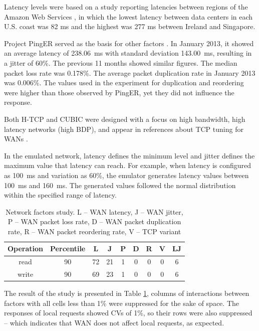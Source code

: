 \documentclass[man,floatsintext,12pt]{apa6}
\begin{document}
Latency levels were based on a study reporting latencies between regions of the
Amazon Web Services \parencite{Sovran2011}, in which the lowest latency between data
centers in each U.S. coast was 82 ms and the highest was 277 ms between Ireland
and Singapore.

Project PingER served as the basis for other factors \parencite{PingER2013}. In
January 2013, it showed an average latency of 238.06~ms with standard deviation
143.00~ms, resulting in a jitter of 60\%. The previous 11 months showed similar
figures. The median packet loss rate was 0.178\%. The average packet
duplication rate in January 2013 was 0.006\%. The values used in the experiment
for duplication and reordering were higher than those observed by PingER, yet
they did not influence the response.

Both H-TCP and CUBIC were designed with a focus on high bandwidth, high latency
networks (high BDP), and appear in references about TCP tuning for WANs
\parencite{ESnet2012}.

In the emulated network, latency defines the minimum level and jitter defines
the maximum value that latency can reach. For example, when latency is
configured as 100~ms and variation as 60\%, the emulator generates latency
values between 100~ms and 160~ms. The generated values followed the normal
distribution within the specified range of latency.

\begin{table}[h!]
\caption{Network factors study. L -- WAN latency, J -- WAN jitter, P -- WAN
packet loss rate, D -- WAN packet duplication rate, R -- WAN packet reordering
rate, V -- TCP variant}
\begin{tabular}{ccccccccc} \toprule

Operation & Percentile & L & J & P & D & R & V & LJ\\ \midrule

read & 90 & 72 & 21 & 1 & 0 & 0 & 0 & 6\\

write & 90 & 69 & 23 & 1 & 0 & 0 & 0 & 6\\ \bottomrule

\end{tabular}
\label{tab:estudo_para_fatores_de_rede}

\end{table}

The result of the study is presented in Table
\ref{tab:estudo_para_fatores_de_rede}, columns of interactions between factors
with all cells less than 1\% were suppressed for the sake of space. The
responses of local requests showed CVs of 1\%, so their rows were also
suppressed -- which indicates that WAN does not affect local requests, as
expected.
\end{document}
